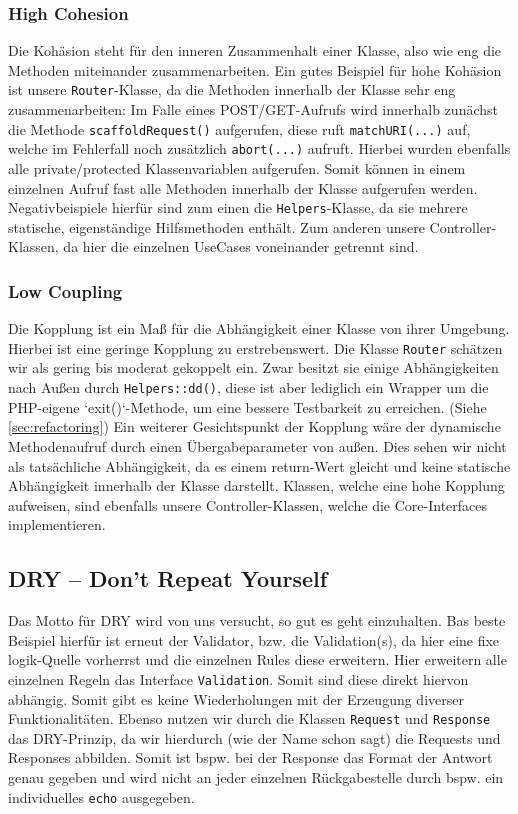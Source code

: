 \documentclass[12pt,a4paper,titlepage,ngerman,pdftex]{report}
\begin{document}
    \subsubsection{High Cohesion}
    Die Kohäsion steht für den inneren Zusammenhalt einer Klasse, also wie \glqq eng\grqq{} die Methoden miteinander zusammenarbeiten.
    Ein gutes Beispiel für hohe Kohäsion ist unsere \verb|Router|-Klasse, da die Methoden innerhalb der Klasse sehr eng zusammenarbeiten:
    Im Falle eines POST/GET-Aufrufs wird innerhalb zunächst die Methode \verb|scaffoldRequest()| aufgerufen, diese ruft \verb|matchURI(...)| auf, welche im Fehlerfall noch zusätzlich \verb|abort(...)| aufruft.
    Hierbei wurden ebenfalls alle private/protected Klassenvariablen aufgerufen.
    Somit können in einem einzelnen Aufruf fast alle Methoden innerhalb der Klasse aufgerufen werden.
    Negativbeispiele hierfür sind zum einen die \verb|Helpers|-Klasse, da sie mehrere statische, eigenständige Hilfsmethoden enthält.
    Zum anderen unsere Controller-Klassen, da hier die einzelnen UseCases voneinander getrennt sind.

    \subsubsection{Low Coupling}
    Die Kopplung ist ein Maß für die Abhängigkeit einer Klasse von ihrer Umgebung.
    Hierbei ist eine geringe Kopplung zu erstrebenswert.
    Die Klasse \verb|Router| schätzen wir als gering bis moderat gekoppelt ein.
    Zwar besitzt sie einige Abhängigkeiten nach Außen durch \verb|Helpers::dd()|, diese ist aber lediglich ein Wrapper um die PHP-eigene `exit()`-Methode, um eine bessere Testbarkeit zu erreichen. (Siehe \ref{sec:refactoring})
    Ein weiterer Gesichtspunkt der Kopplung wäre der dynamische Methodenaufruf durch einen Übergabeparameter von außen.
    Dies sehen wir nicht als tatsächliche Abhängigkeit, da es einem return-Wert gleicht und keine statische Abhängigkeit innerhalb der Klasse darstellt.
    Klassen, welche eine hohe Kopplung aufweisen, sind ebenfalls unsere Controller-Klassen, welche die Core-Interfaces implementieren.

    
    \subsection{DRY -- Don't Repeat Yourself}
    \label{subsec:dry}
    Das Motto für DRY wird von uns versucht, so gut es geht einzuhalten.
    Bas beste Beispiel hierfür ist erneut der Validator, bzw. die Validation(s), da hier eine fixe logik-Quelle vorherrst und die einzelnen Rules diese erweitern.
    Hier erweitern alle einzelnen Regeln das Interface \verb|Validation|.
    Somit sind diese direkt hiervon abhängig.
    Somit gibt es keine Wiederholungen mit der Erzeugung diverser Funktionalitäten.
    Ebenso nutzen wir durch die Klassen \verb|Request| und \verb|Response| das DRY-Prinzip, da wir hierdurch (wie der Name schon sagt) die Requests und Responses abbilden.
    Somit ist bspw. bei der Response das Format der Antwort genau gegeben und wird nicht an jeder einzelnen Rückgabestelle durch bspw. ein individuelles \verb|echo| ausgegeben.
\end{document}
